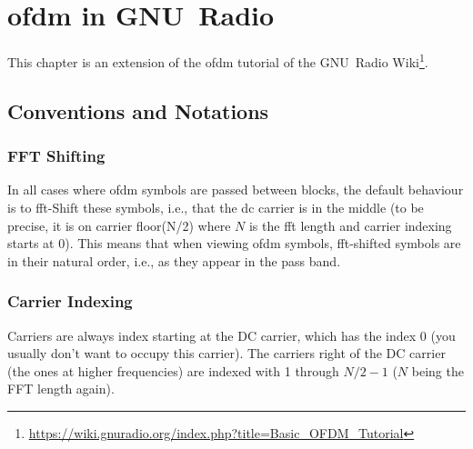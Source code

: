 \chapter{\Acrshort{ofdm} in GNU~Radio}\label{chap:ofdm-gnuradio}

This chapter is an extension of the \gls{ofdm} tutorial of the GNU~Radio Wiki\footnote{\url{https://wiki.gnuradio.org/index.php?title=Basic_OFDM_Tutorial}}.




\section{Conventions and Notations}\label{sec:ofdm-conventions}

\subsection{FFT Shifting}
In all cases where \gls{ofdm} symbols are passed between blocks, the default behaviour is to \gls{fft}-Shift these symbols, i.e., that the \gls{dc} carrier is in the middle (to be precise, it is on carrier floor(N/2) where $N$ is the \gls{fft} length and carrier indexing starts at $0$).
This means that when viewing \gls{ofdm} symbols, \gls{fft}-shifted symbols are in their natural order, i.e., as they appear in the pass band.

\subsection{Carrier Indexing}
Carriers are always index starting at the DC carrier, which has the index 0 (you usually don't want to occupy this carrier). The carriers right of the DC carrier (the ones at higher frequencies) are indexed with 1 through $N/2-1$ ($N$ being the FFT length again).

